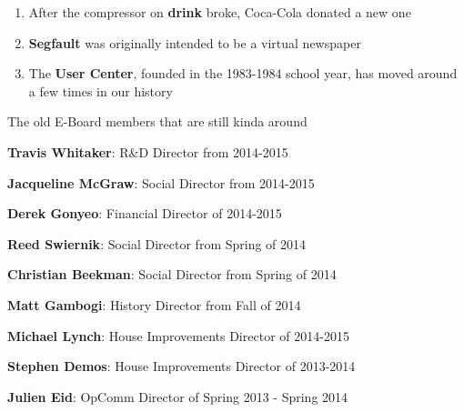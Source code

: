 \documentclass[9pt]{extarticle} %
\begin{document}
\begin{minipage}[t]{.61\linewidth}
\hypertarget{secondnews}{} 

\begin{enumerate}
\item After the compressor on \textbf{drink} broke, Coca-Cola donated 
	a new one
\\
\item \textbf{Segfault} was originally intended to be a virtual newspaper
\\
\item The \textbf{User Center}, founded in the 1983-1984 school year,
	has moved around a few times in our history
\end{enumerate}

\hypertarget{thirdnews}{} 

\centerline{The old E-Board members that are still kinda around} 
\centerline{}
\centerline{\textbf{Travis Whitaker}: R\&D Director from 2014-2015} 
\centerline{\textbf{Jacqueline McGraw}: Social Director from 2014-2015}
\centerline{\textbf{Derek Gonyeo}: Financial Director of 2014-2015} 
\centerline{\textbf{Reed Swiernik}: Social Director from Spring of 2014} 
\centerline{\textbf{Christian Beekman}: Social Director from Spring of 2014} 
\centerline{\textbf{Matt Gambogi}: History Director from Fall of 2014}
\centerline{\textbf{Michael Lynch}: House Improvements Director of
 2014-2015}
\centerline{\textbf{Stephen Demos}: House Improvements Director of 
2013-2014}
\centerline{\textbf{Julien Eid}: OpComm Director of Spring 2013 - Spring 2014}

\end{minipage} %
\end{document}
